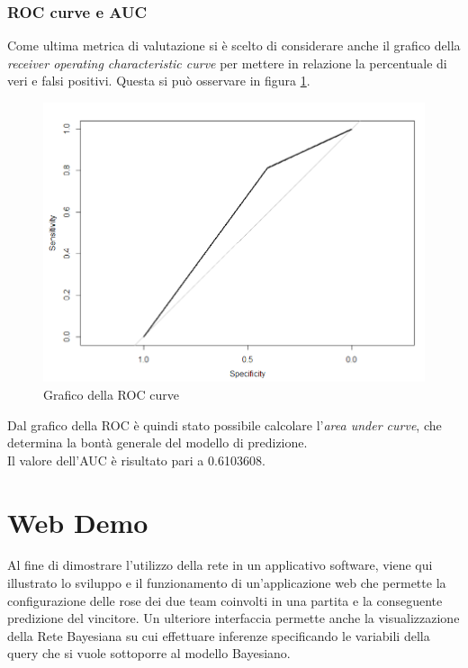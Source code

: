 \documentclass[hidelinks, 12pt]{article}
\begin{document}
\subsubsection{ROC curve e AUC}

Come ultima metrica di valutazione si è scelto di considerare anche il grafico della \textit{receiver operating characteristic curve} per mettere in relazione la percentuale di veri e falsi positivi. Questa si può osservare in figura \ref{fig:perf-roc}.

\begin{figure}[H]
	\centering
	\includegraphics[scale=0.6]{images/06_roc.png}
	\caption[Grafico della ROC curve]{Grafico della ROC curve}
	\label{fig:perf-roc}
\end{figure}

Dal grafico della ROC è quindi stato possibile calcolare l'\textit{area under curve}, che determina la bontà generale del modello di predizione. \\ Il valore dell'AUC è risultato pari a 0.6103608.




\clearpage



\section{Web Demo}
\label{sec:ui}

Al fine di dimostrare l'utilizzo della rete in un applicativo software, viene qui illustrato lo sviluppo e il funzionamento di un'applicazione web che permette la configurazione delle rose dei due team coinvolti in una partita e la conseguente predizione del vincitore. Un ulteriore interfaccia permette anche la visualizzazione della Rete Bayesiana su cui effettuare inferenze specificando le variabili della query che si vuole sottoporre al modello Bayesiano.
\end{document}
